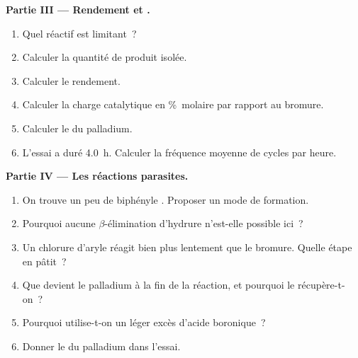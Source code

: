 \begin{problem}
\medskip
\noindent\textbf{Partie III --- Rendement et .}
\begin{enumerate}[resume]
  \item Quel réactif est limitant~?
  \item Calculer la quantité de produit isolée.
  \item Calculer le rendement.
  \item Calculer la charge catalytique en \%~molaire par rapport au bromure.
  \item Calculer le  du palladium.
  \item L'essai a duré \qty{4.0}{h}. Calculer la fréquence moyenne de cycles par heure.
\end{enumerate}

\medskip
\noindent\textbf{Partie IV --- Les réactions parasites.}
\begin{enumerate}[resume]
  \item On trouve un peu de biphényle . Proposer un mode de formation.
  \item Pourquoi aucune $\beta$-élimination d'hydrure n'est-elle possible ici~?
  \item Un chlorure d'aryle réagit bien plus lentement que le bromure. Quelle étape en pâtit~?
  \item Que devient le palladium à la fin de la réaction, et pourquoi le récupère-t-on~?
  \item Pourquoi utilise-t-on un léger excès d'acide boronique~?
  \item Donner le  du palladium dans l'essai.
\end{enumerate}
\end{problem}
